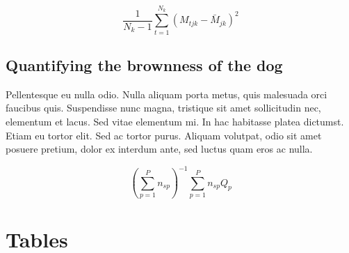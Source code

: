 \documentclass[11pt]{article}
\begin{document}
\begin{equation}
{ \frac{1}{N_k-1} \sum \limits_{t=1}^{N_k} (M_{tjk} - \bar{M}_{jk})^2}
\end{equation}

\subsection*{Quantifying the brownness of the dog}

Pellentesque eu nulla odio. Nulla aliquam porta metus, quis malesuada orci faucibus quis. Suspendisse nunc magna, tristique sit amet sollicitudin nec, elementum et lacus. Sed vitae elementum mi. In hac habitasse platea dictumst. Etiam eu tortor elit. Sed ac tortor purus. Aliquam volutpat, odio sit amet posuere pretium, dolor ex interdum ante, sed luctus quam eros ac nulla. 

\begin{equation}
{ (\sum \limits_{p=1}^P {n_{sp}})^{-1}\sum \limits_{p=1}^P {n_{sp}Q_{p}}}
\end{equation}

\newpage{}

%
%


\newpage{}



\section*{Tables}
\renewcommand{\thetable}{\arabic{table}}
\setcounter{table}{0}
\end{document}
